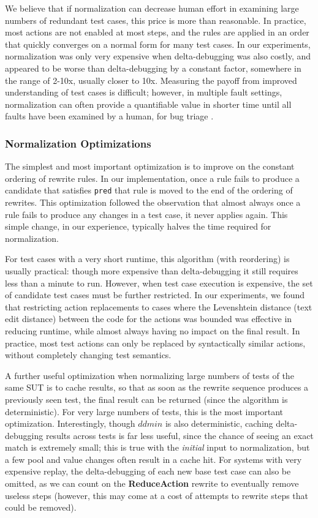 We believe that if normalization can decrease human effort in
examining large numbers of redundant test cases, this price is more
than reasonable.  In practice, most actions are not enabled at most
steps, and the rules are applied in an order that quickly converges on
a normal form for many test cases.  In our experiments, normalization
was only very expensive when delta-debugging was also costly, and
appeared to be worse than delta-debugging by a constant factor,
somewhere in the range of 2-10x, usually closer to 10x.  Measuring the
payoff from improved understanding of test cases is difficult;
however, in multiple fault settings, normalization can often
provide a quantifiable value in shorter time until all faults have
been examined by a human, for bug triage \cite{PLDI13}.

\subsubsection{Normalization Optimizations}

The simplest and most important optimization is to improve on the
constant ordering of rewrite rules.  In our implementation, once a
rule fails to produce a candidate that satisfies {\tt pred} that rule
is moved to the end of the ordering of rewrites.  This optimization
followed the observation that almost always once a rule fails to
produce any changes in a test case, it never applies again.  This
simple change, in our experience, typically halves the time required
for normalization.

For test cases with a very short runtime, this algorithm (with
reordering) is usually practical: though more expensive than delta-debugging
it still requires  less than a minute to run.  However, when test case
execution is expensive, the set of candidate test cases must be
further restricted.  In our experiments, we found that restricting
action replacements to cases where the Levenshtein \cite{Lev} distance
(text edit distance) between the code for the actions was bounded was effective in reducing runtime, while almost always having no
impact on the final result.  In practice, most test actions can only
be replaced by syntactically similar actions, without completely
changing test semantics.

A further useful optimization when normalizing large numbers of tests
of the same SUT is to cache results, so that as soon as the rewrite
sequence produces a previously seen test, the final result can be
returned (since the algorithm is deterministic).   For very large
numbers of tests, this is the most important optimization.
Interestingly, though $ddmin$ is also deterministic, caching
delta-debugging results across tests is far less useful, since the chance of seeing
an exact match is extremely small; this is true with the \emph{initial} input to
normalization, but a few pool and value changes often result in a
cache hit. For systems with
very expensive replay, the delta-debugging of each new base test case
can also be omitted, as we can count on the {\bf ReduceAction} rewrite to
eventually remove useless steps (however, this may come at a cost of
attempts to rewrite steps that could be removed).

